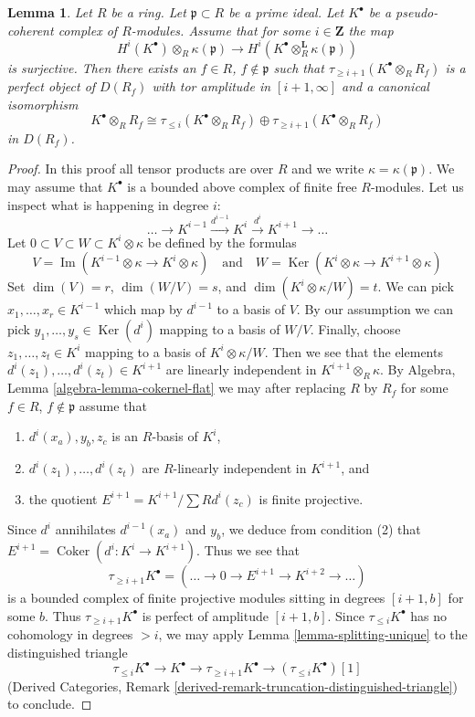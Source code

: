 \documentclass[10pt,a4paper]{amsart}
\theoremstyle{plain}
\newtheorem{lemma}[subsection]{Lemma}
\theoremstyle{definition}
\theoremstyle{remark}
\numberwithin{equation}{subsection}
\def\Ker{\mathop{\mathrm{Ker}}}
\def\Im{\mathop{\mathrm{Im}}}
\def\Coker{\mathop{\mathrm{Coker}}}
\begin{document}
\begin{lemma}
\label{lemma-better-cut-complex-in-two}
Let $R$ be a ring. Let $\mathfrak p \subset R$ be a prime ideal.
Let $K^\bullet$ be a pseudo-coherent complex of $R$-modules.
Assume that for some $i \in \mathbf{Z}$ the map
$$
H^i(K^\bullet) \otimes_R \kappa(\mathfrak p)
\longrightarrow
H^i(K^\bullet \otimes_R^{\mathbf{L}} \kappa(\mathfrak p))
$$
is surjective. Then there exists an $f \in R$, $f \not \in \mathfrak p$
such that $\tau_{\geq i + 1}(K^\bullet \otimes_R R_f)$ is a perfect
object of $D(R_f)$ with tor amplitude in $[i + 1, \infty]$ and
a canonical isomorphism
$$
K^\bullet \otimes_R R_f \cong
\tau_{\leq i}(K^\bullet \otimes_R R_f) \oplus
\tau_{\geq i + 1}(K^\bullet \otimes_R R_f)
$$
in $D(R_f)$.
\end{lemma}

\begin{proof}
In this proof all tensor products are over $R$ and we write
$\kappa = \kappa(\mathfrak p)$. We may assume that $K^\bullet$
is a bounded above complex of finite free $R$-modules. Let us
inspect what is happening in degree $i$:
$$
\ldots \to K^{i - 1} \xrightarrow{d^{i - 1}} K^i \xrightarrow{d^i}
K^{i + 1} \to \ldots
$$
Let $0 \subset V \subset W \subset K^i \otimes \kappa$ be defined
by the formulas
$$
V = \Im\left(
K^{i - 1} \otimes \kappa \to K^i \otimes \kappa
\right)
\quad\text{and}\quad
W = \Ker\left(
K^i \otimes \kappa \to K^{i + 1} \otimes \kappa
\right)
$$
Set $\dim(V) = r$, $\dim(W/V) = s$, and $\dim(K^i \otimes \kappa/W) = t$.
We can pick $x_1, \ldots, x_r \in K^{i - 1}$ which map by $d^{i - 1}$
to a basis of $V$. By our assumption we can pick
$y_1, \ldots, y_s \in \Ker(d^i)$ mapping to a basis of $W/V$.
Finally, choose $z_1, \ldots, z_t \in K^i$ mapping to a basis of
$K^i \otimes \kappa/W$. Then we see that the elements
$d^i(z_1), \ldots, d^i(z_t) \in K^{i + 1}$ are linearly independent
in $K^{i + 1} \otimes_R \kappa$.
By Algebra, Lemma \ref{algebra-lemma-cokernel-flat} we may after replacing
$R$ by $R_f$ for some $f \in R$, $f \not \in \mathfrak p$ assume that
\begin{enumerate}
\item $d^i(x_a), y_b, z_c$ is an $R$-basis of $K^i$,
\item $d^i(z_1), \ldots, d^i(z_t)$ are $R$-linearly independent in
$K^{i + 1}$, and
\item the quotient $E^{i + 1} = K^{i + 1}/\sum Rd^i(z_c)$ is finite projective.
\end{enumerate}
Since $d^i$ annihilates $d^{i - 1}(x_a)$ and $y_b$, we deduce from
condition (2) that $E^{i + 1} = \Coker(d^i : K^i \to K^{i + 1})$.
Thus we see that
$$
\tau_{\geq i + 1}K^\bullet =
(\ldots \to 0 \to E^{i + 1} \to K^{i + 2} \to \ldots)
$$
is a bounded complex of finite projective modules sitting in degrees
$[i + 1, b]$ for some $b$. Thus $\tau_{\geq i + 1}K^\bullet$ is perfect
of amplitude $[i + 1, b]$. Since $\tau_{\leq i}K^\bullet$ has no
cohomology in degrees $> i$, we may apply Lemma \ref{lemma-splitting-unique}
to the distinguished triangle
$$
\tau_{\leq i}K^\bullet \to K^\bullet \to \tau_{\geq i + 1}K^\bullet \to
(\tau_{\leq i}K^\bullet)[1]
$$
(Derived Categories, Remark
\ref{derived-remark-truncation-distinguished-triangle}) to conclude.
\end{proof}
\end{document}
